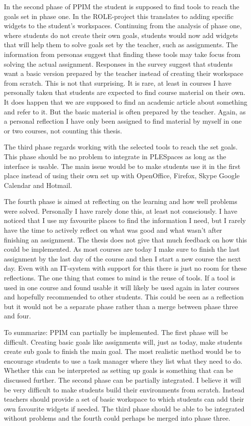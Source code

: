 In the second phase of PPIM the student is supposed to find tools to reach the goals set in phase one. In the ROLE-project this translates to adding specific widgets to the student's workspaces. Continuing from the analysis of phase one, where students do not create their own goals, students would now add widgets that will help them to solve goals set by the teacher, such as assignments. The information from personas suggest that finding these tools may take focus from solving the actual assignment. Responses in the survey suggest that students want a basic version prepared by the teacher instead of creating their workspace from scratch. This is not that surprising. It is rare, at least in courses I have personally taken that students are expected to find course material on their own. It does happen that we are supposed to find an academic article about something and refer to it. But the basic material is often prepared by the teacher. Again, as a personal reflection I have only been assigned to find material by myself in one or two courses, not counting this thesis.

The third phase regards working with the selected tools to reach the set goals. This phase should be no problem to integrate in PLESpaces as long as the interface is usable. The main issue would be to make students use it in the first place instead of using their own set up with OpenOffice, Firefox, Skype Google Calendar and Hotmail.

The fourth phase is aimed at reflecting on the learning and how well problems were solved. Personally I have rarely done this, at least not consciously. I have noticed that I use my favourite places to find the information I need, but I rarely have the time to actively reflect on what was good and what wasn't after finishing an assignment. The thesis does not give that much feedback on how this could be implemented. As most courses are today I make sure to finish the last assignment by the last day of the course and then I start a new course the next day. Even with an IT-system with support for this there is just no room for these reflections. The one thing that comes to mind is the reuse of tools. If a tool is used in one course and found usable it will likely be used again in later courses and hopefully recommended to other students. This could be seen as a reflection but it would not be a separate phase rather than a merge between phase three and four.

To summarize: PPIM can partially be implemented. The first phase will be difficult. Creating basic goals like assignments will, just as today, make students create sub goals to finish the main goal. The most realistic method would be to encourage students to use a task manager where they list what they need to do. Whether this can be interpreted as setting up goals is something that can be discussed further. The second phase can be partially integrated. I believe it will be very difficult to make students build their environments from scratch. Instead teachers should provide a set of basic workspace to which students can add their own favourite widgets if needed. The third phase should be able to be integrated without problems and the fourth could perhaps be merged into phase three.

